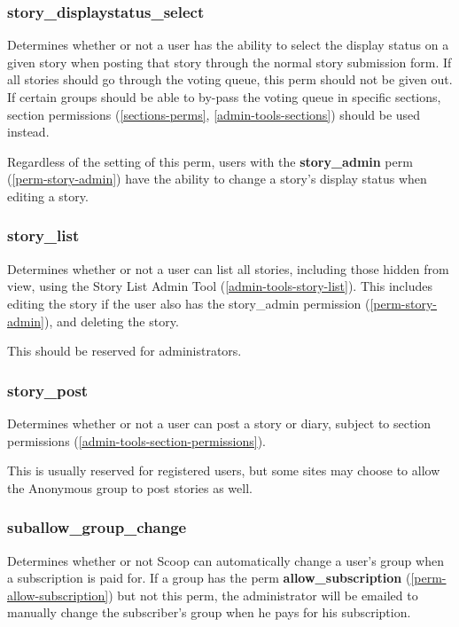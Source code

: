 \subsubsection{story\_displaystatus\_select}
\label{perm-story-displaystatus-select}

Determines whether or not a user has the ability to select the display status on a given story when posting that story through the normal story submission form. If all stories should go through the voting queue, this perm should not be given out. If certain groups should be able to by-pass the voting queue in specific sections, section permissions (\ref{sections-perms}, \ref{admin-tools-sections}) should be used instead.

Regardless of the setting of this perm, users with the {\bf story\_admin} perm (\ref{perm-story-admin}) have the ability to change a story's display status when editing a story.

\subsubsection{story\_list}
\label{perm-story-list}

Determines whether or not a user can list all stories, including those hidden from view, using the Story List Admin Tool (\ref{admin-tools-story-list}).  This includes editing the story if the user also has the story\_admin permission (\ref{perm-story-admin}), and deleting the story.

This should be reserved for administrators.

\subsubsection{story\_post}
\label{perm-story-post}

Determines whether or not a user can post a story or diary, subject to section permissions (\ref{admin-tools-section-permissions}).

This is usually reserved for registered users, but some sites may choose to allow the Anonymous group to post stories as well.

\subsubsection{suballow\_group\_change}
\label{perm-suballow-group-change}

Determines whether or not Scoop can automatically change a user's group when a subscription is paid for. If a group has the perm {\bf allow\_subscription} (\ref{perm-allow-subscription}) but not this perm, the administrator will be emailed to manually change the subscriber's group when he pays for his subscription.

